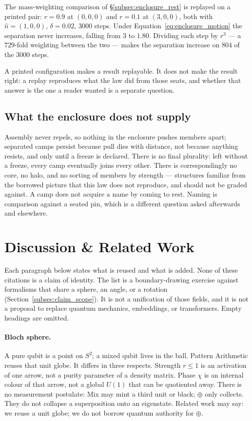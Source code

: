 \documentclass[12pt, a4paper]{article}
\begin{document}
The mass-weighting comparison of \S\ref{subsec:enclosure_rest} is
replayed on a printed pair: $r=0.9$ at $(0,0,0)$ and $r=0.1$ at
$(3,0,0)$, both with $\hat n=(1,0,0)$, $\delta=0.02$, $3000$ steps.
Under Equation~\eqref{eq:enclosure_motion} the separation never
increases, falling from $3$ to $1.80$. Dividing each step by $r^3$ ---
a $729$-fold weighting between the two --- makes the separation
increase on $804$ of the $3000$ steps.

A printed configuration makes a result replayable. It does not make
the result right: a replay reproduces what the law did from those
seats, and whether that answer is the one a reader wanted is a
separate question.

\subsection{What the enclosure does not supply}
\label{subsec:enclosure_open}
Assembly never repels, so nothing in the enclosure pushes members
apart; separated camps persist because pull dies with distance, not
because anything resists, and only until a freeze is declared. There
is no final plurality: left without a freeze, every camp eventually
joins every other. There is correspondingly no core, no halo,
and no sorting of members by strength --- structures familiar from
the borrowed picture that this law does not reproduce, and should not
be graded against. A camp does not acquire a name by coming to rest.
Naming is comparison against a seated pin, which is a different
question asked afterwards and elsewhere.


\section{Discussion \& Related Work}
\label{sec:related}

Each paragraph below states what is reused and what is added. None of
these citations is a claim of identity. The list is a
boundary-drawing exercise against formalisms that share a sphere, an
angle, or a rotation
(Section~\ref{subsec:claim_scope}). It is not a unification of those
fields, and it is not a proposal to replace quantum mechanics,
embeddings, or transformers. Empty headings are omitted.

\paragraph{Bloch sphere.}
A pure qubit is a point on $S^2$; a mixed qubit lives in the ball.
Pattern Arithmetic reuses that unit globe. It differs in three
respects. Strength $r\le 1$ is an activation of one arrow, not a purity
parameter of a density matrix. Phase $\chi$ is an internal colour of
that arrow, not a global $U(1)$ that can be quotiented away. There is
no measurement postulate: Mix may mint a third unit or black; $\oplus$
only collects. They do not collapse a superposition onto an eigenstate. Related work
may say: we reuse a unit globe; we do not borrow quantum authority for
$\oplus$.
\end{document}

